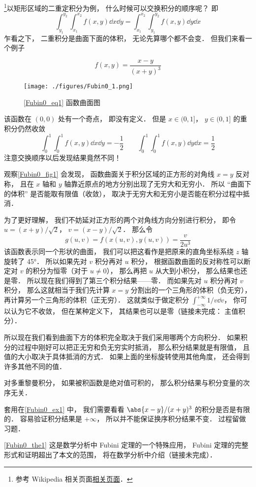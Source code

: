

\footnote{参考 Wikipedia 相关页面\href{https://en.wikipedia.org/wiki/Fubini's_theorem}{相关页面}．}以矩形区域的二重定积分为例， 什么时候可以交换积分的顺序呢？ 即
\begin{equation}
\int_{y_1}^{y_2}\int_{x_1}^{x_2} f(x, y) \dd{x} \dd{y} = \int_{x_1}^{x_2}\int_{y_1}^{y_2} f(x, y) \dd{y}\dd{x}
\end{equation}
乍看之下， 二重积分是曲面下面的体积， 无论先算哪个都不会变． 但我们来看一个例子

\begin{example}{}\label{Fubin0_ex1}
\begin{equation}\label{Fubin0_eq1}
f(x, y) = \frac{x - y}{(x+y)^3}
\end{equation}
\begin{figure}[ht]
\centering
\texttt{[image: ./figures/Fubin0\_1.png]}
\caption{\autoref{Fubin0_eq1} 函数曲面图} \label{Fubin0_fig1}
\end{figure}
该函数在 $(0,0)$ 处有一个奇点， 即没有定义． 但是 $x \in (0, 1]$， $y \in (0, 1]$ 的重积分仍然收敛
\begin{equation}
\int_0^1 \int_0^1 f(x,y) \dd{x} \dd{y} = -\frac{1}{2}
\qquad
\int_0^1 \int_0^1 f(x,y) \dd{y} \dd{x} = \frac{1}{2}
\end{equation}
注意交换顺序以后发现结果竟然不同！

观察\autoref{Fubin0_fig1} 会发现， 函数曲面关于积分区域的正方形的对角线 $x=y$ 反对称， 且在 $x$ 轴和 $y$ 轴靠近原点的地方分别出现了无穷大和无穷小． 所以 “曲面下的体积” 是否能取有限值（收敛）， 取决于无穷大和无穷小是否能在积分过程中抵消．

为了更好理解， 我们不妨延对正方形的两个对角线方向分别进行积分， 即令 $u = (x+y)/\sqrt{2}$， $v=(x-y)/\sqrt{2}$． 那么令
\begin{equation}
g(u,v) = f(x(u,v), y(u,v)) = \frac{v}{2u^3}
\end{equation}
该函数表示同一个形状的曲面， 我们可以把这看作是把原来的直角坐标系绕 $z$ 轴旋转了 45°． 所以如果先对 $v$ 积分再对 $u$ 积分， 根据函数曲面的反对称性可以断定对 $v$ 的积分为恒零（对于 $u\ne 0$）， 那么再把 $u$ 从大到小积分， 那么结果也还是零． 所以现在我们得到了第三个积分结果——零． 而如果先对 $u$ 积分再对 $v$ 积分， 那么这就相当于我们先计算 $x=y$ 分割出的一个三角形的体积（负无穷）， 再计算另一个三角形的体积（正无穷）． 这就类似于做定积分 $\int_{-\infty}^{+\infty}1/v\dd{v}$， 你可以认为它不收敛， 但在某种定义下， 其结果也可以是零（链接未完成： 主值积分）．

所以现在我们看到曲面下方的体积完全取决于我们采用哪两个方向积分． 如果积分的过程中刚好可以把正无穷和负无穷实时抵消， 那么积分结果就是有限值， 且值的大小取决于具体抵消的方式． 如果上面的坐标旋转使用其他角度， 还会得到许多其他不同的值．
\end{example}

\begin{theorem}{}\label{Fubin0_the1}
对多重黎曼积分， 如果被积函数是绝对值可积的， 那么积分结果与积分变量的次序无关．
\end{theorem}

套用在\autoref{Fubin0_ex1} 中， 我们需要看看 $\abs{x-y}/(x+y)^3$ 的积分是否是有限的． 容易验证积分结果是 $+\infty$， 所以并不能保证换序积分结果不变． 过程留做习题．

\autoref{Fubin0_the1} 这是数学分析中 Fubini 定理的一个特殊应用， Fubini 定理的完整形式和证明超出了本文的范围， 将在数学分析中介绍（链接未完成）．
